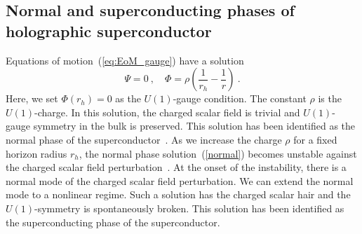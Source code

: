 \documentclass[a4paper,11pt]{article}
\begin{document}
\subsection{Normal and superconducting phases of holographic superconductor}


    Equations of motion~(\ref{eq:EoM_gauge}) have a solution
    \begin{equation}
        \Psi=0\ ,\quad \Phi=\rho \left(\frac{1}{r_h}-\frac{1}{r}\right)\ .
        \label{normal}
    \end{equation}
    Here, we set $\Phi(r_h)=0$ as the $U(1)$-gauge condition. The constant $\rho$ is the $U(1)$-charge.
    In this solution, the charged scalar field is trivial and $U(1)$-gauge symmetry in the bulk is preserved.
    This solution has been identified as the normal phase of the superconductor~\cite{Hartnoll:2008vx}.
    As we increase the charge $\rho$ for a fixed horizon radius $r_h$, 
    the normal phase solution~(\ref{normal}) becomes unstable against the charged scalar field perturbation~\cite{Gubser:2008px}.
    At the onset of the instability, there is a normal mode of the charged scalar field perturbation.
    We can extend the normal mode to a nonlinear regime.
    Such a solution has the charged scalar hair and the $U(1)$-symmetry is spontaneously broken. 
    This solution has been identified as the superconducting phase of the superconductor.
\end{document}
